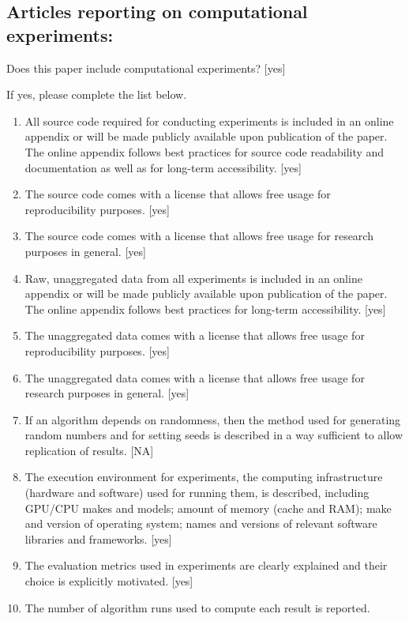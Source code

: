 \documentclass[]{jair}
\begin{document}
\subsection*{Articles reporting on computational experiments:}
Does this paper include computational experiments? [yes]

If yes, please complete the list below.
\begin{enumerate}
    \item 
    All source code required for conducting experiments is included in an online appendix 
    or will be made publicly available upon publication of the paper.
    The online appendix follows best practices for source code readability and documentation as well as for long-term accessibility.
    [yes]
    \item The source code comes with a license that
    allows free usage for reproducibility purposes.
    [yes]
    \item The source code comes with a license that
    allows free usage for research purposes in general.
    [yes]
    \item 
    Raw, unaggregated data from all experiments is included in an online appendix 
    or will be made publicly available upon publication of the paper.
    The online appendix follows best practices for long-term accessibility.
    [yes]
    \item The unaggregated data comes with a license that
    allows free usage for reproducibility purposes.
    [yes]
    \item The unaggregated data comes with a license that
    allows free usage for research purposes in general.
    [yes]
    \item If an algorithm depends on randomness, then the method used for generating random numbers and for setting seeds is described in a way sufficient to allow replication of results. 
    [NA]
    \item The execution environment for experiments, the computing infrastructure (hardware and software) used for running them, is described, including GPU/CPU makes and models; amount of memory (cache and RAM); make and version of operating system; names and versions of relevant software libraries and frameworks. 
    [yes]
    \item 
    The evaluation metrics used in experiments are clearly explained and their choice is explicitly motivated. 
    [yes]
    \item 
    The number of algorithm runs used to compute each result is reported. 

\end{enumerate}
\end{document}
